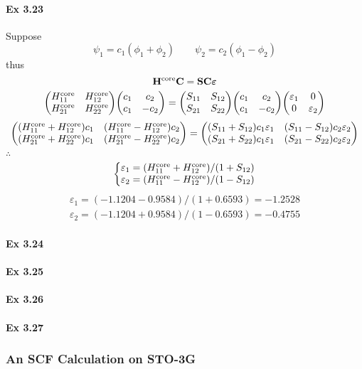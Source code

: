 \documentclass[a4paper]{article}
\DeclareMathOperator{\core}{\mathrm{core}}
\newcommand{\ex}[1]{\paragraph{Ex #1}}
\numberwithin{equation}{subsection}
\begin{document}
\ex{3.23}
Suppose
\begin{equation}\label{key}
\psi_1 = c_1 (\phi_1 + \phi_2) \qquad \psi_2 = c_2 (\phi_1 - \phi_2)
\end{equation}
thus
\begin{equation}\label{key}
\vb{H}^{\core} \vb{C} = \vb{S} \vb{C} \bm\varepsilon
\end{equation}
\begin{equation}\label{key}
\mqty(H_{11}^{\core} & H_{12}^{\core}\\ H_{21}^{\core} & H_{22}^{\core}) \mqty(c_1 & c_2\\ c_1 & -c_2) = \mqty(S_{11} & S_{12}\\ S_{21} & S_{22}) \mqty(c_1 & c_2\\ c_1 & -c_2) \mqty(\varepsilon_1 & 0\\ 0 &\varepsilon_2 ) 
\end{equation}
\begin{equation}\label{key}
\mqty((H_{11}^{\core} + H_{12}^{\core}) c_1 & (H_{11}^{\core} - H_{12}^{\core}) c_2 \\ 
(H_{21}^{\core} + H_{22}^{\core}) c_1 & (H_{21}^{\core} - H_{22}^{\core})c_2)
= \mqty((S_{11} + S_{12}) c_1\varepsilon_1 & (S_{11} - S_{12}) c_2\varepsilon_2\\
(S_{21} + S_{22}) c_1\varepsilon_1 & (S_{21} - S_{22}) c_2\varepsilon_2)
\end{equation}
$ \therefore $
\begin{equation}\label{key}
\left\{ \mqty{\varepsilon_1 = (H_{11}^{\core} + H_{12}^{\core})/(1 + S_{12}) \\
\varepsilon_2 = (H_{11}^{\core} - H_{12}^{\core})/(1 - S_{12})}
\right.
\end{equation}
\begin{align}
\varepsilon_1 = (-1.1204-0.9584)/(1+0.6593) = -1.2528\\
\varepsilon_2 = (-1.1204+0.9584)/(1-0.6593) = -0.4755
\end{align}

\ex{3.24}


\ex{3.25}


\ex{3.26}


\ex{3.27}


\subsubsection{An SCF Calculation on STO-3G }
\end{document}
